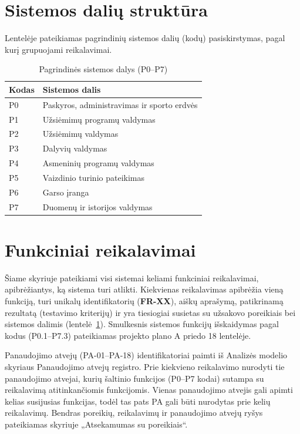 \section{Sistemos dalių struktūra}
Lentelėje pateikiamas pagrindinių sistemos dalių (kodų) pasiskirstymas, pagal kurį grupuojami reikalavimai.

\begin{table}[h!]
\centering
\begin{tabular}{|l|l|}
\hline
\textbf{Kodas} & \textbf{Sistemos dalis} \\ \hline
P0 & Paskyros, administravimas ir sporto erdvės \\ \hline
P1 & Užsiėmimų programų valdymas \\ \hline
P2 & Užsiėmimų valdymas \\ \hline
P3 & Dalyvių valdymas \\ \hline
P4 & Asmeninių programų valdymas \\ \hline
P5 & Vaizdinio turinio pateikimas \\ \hline
P6 & Garso įranga \\ \hline
P7 & Duomenų ir istorijos valdymas \\ \hline
\end{tabular}
\caption{Pagrindinės sistemos dalys (P0--P7)}
\label{tab:sistemos_dalys}
\end{table}

\section{Funkciniai reikalavimai}

Šiame skyriuje pateikiami visi sistemai keliami funkciniai reikalavimai, apibrėžiantys, ką sistema turi atlikti. Kiekvienas reikalavimas apibrėžia vieną funkciją, turi unikalų identifikatorių (\textbf{FR-XX}), aiškų aprašymą, patikrinamą rezultatą (testavimo kriterijų) ir yra tiesiogiai susietas su užsakovo poreikiais bei sistemos dalimis (lentelė~\ref{tab:sistemos_dalys}). Smulkesnis sistemos funkcijų išskaidymas pagal kodus (P0.1--P7.3) pateikiamas projekto plano A priedo 18 lentelėje.

Panaudojimo atvejų (PA-01--PA-18) identifikatoriai paimti iš Analizės modelio skyriaus Panaudojimo atvejų registro. Prie kiekvieno reikalavimo nurodyti tie panaudojimo atvejai, kurių šaltinio funkcijos (P0--P7 kodai) sutampa su reikalavimą atitinkančiomis funkcijomis. Vienas panaudojimo atvejis gali apimti kelias susijusias funkcijas, todėl tas pats PA gali būti nurodytas prie kelių reikalavimų. Bendras poreikių, reikalavimų ir panaudojimo atvejų ryšys pateikiamas skyriuje „Atsekamumas su poreikiais“.

